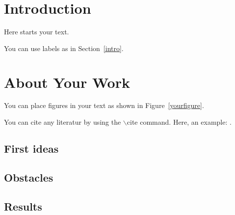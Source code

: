 


\clearpage
\tableofcontents
\clearpage

\section{Introduction\label{intro}}
Here starts your text.
\par
You can use labels as in Section~\ref{intro}.

\section{About Your Work}
You can place figures in your text as shown in Figure~\ref{yourfigure}.
\par
You can cite any literatur by using the $\backslash$cite command. 
Here, an example: \cite{btt:1998}.
\subsection{First ideas}
\subsection{Obstacles}
\subsection{Results}

\clearpage
\appendix




